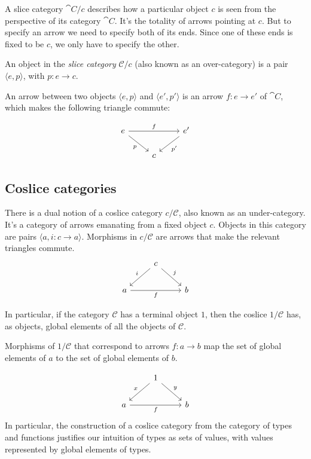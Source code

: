 \documentclass[DaoFP]{subfiles}
\begin{document}
A slice category $\cat C/c$ describes how a particular object $c$ is seen from the perspective of its category $\cat C$. It's the totality of arrows pointing at $c$. But to specify an arrow we need to specify both of its ends. Since one of these ends is fixed to be $c$, we only have to specify the other.

An object in the  \emph{slice category} $\mathcal{C}/c$ (also known as an over-category) is a pair $\langle e, p \rangle$, with $p \colon e \to c$.  

An arrow between two objects $\langle e, p \rangle$ and $\langle e', p' \rangle$ is an arrow $f \colon e \to e'$ of $\cat C$, which makes the following triangle commute:

\[
 \begin{tikzcd}
 e
 \arrow[rd, "p"']
 \arrow[rr, "f"]
 && e'
 \arrow[ld, "p'"]
 \\
 &c
  \end{tikzcd}
\]

\subsection{Coslice categories}

There is a dual notion of a coslice category $c / \mathcal{C}$, also known as an under-category. It's a category of arrows emanating from a fixed object $c$. Objects in this category are pairs $\langle a, i \colon c \to a \rangle$. Morphisms in $c / \mathcal{C}$ are arrows that make the relevant  triangles commute.
\[
 \begin{tikzcd}
& c
 \arrow[rd, "j"]
 \arrow[ld, "i"']
 \\
a
\arrow[rr, "f"']
&& b
  \end{tikzcd}
\]

In particular, if the category $\mathcal{C}$ has a terminal object $1$, then the coslice $1 / \mathcal{C}$ has, as objects, global elements of all the objects of $\mathcal{C}$. 


Morphisms of $1/  \mathcal{C}$ that correspond to arrows $f \colon a \to b$ map the set of global elements of $a$ to the set of global elements of $b$.

 \[
 \begin{tikzcd}
& 1
 \arrow[rd, "y"]
 \arrow[ld, "x"']
 \\
a
\arrow[rr, "f"']
&& b
  \end{tikzcd}
\]
In particular, the construction of a coslice category from the category of types and functions justifies our intuition of types as sets of values, with values represented by global elements of types. 
\end{document}
